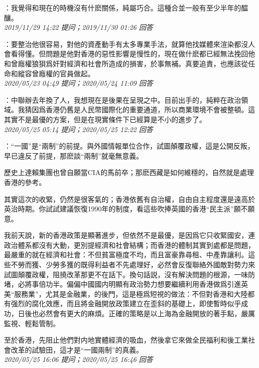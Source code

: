 \documentclass[twocolumn]{ctexart}
\begin{document}
：我覺得和現在的時機沒有什麽關係，純屬巧合。這種合並一般有至少半年的醖釀。
\\

\textit{\hfill\noindent\small 2019/11/29 14:22 提问；2019/11/30 01:26 回答}

：要整治他很容易，對他的資產動手有太多專業手法，就算他找媒體來渲染都沒人會看得懂。但問題是他對香港的惡性影響是慢性的，現在做什麽都已經無法挽回他和曾廕權狼狽爲奸對經濟和社會所造成的損害，於事無補。真要追責，也應該從任命和縱容曾廕權的官員做起。
\\

\textit{\hfill\noindent\small 2020/05/23 04:49 提问；2020/05/24 11:09 回答}

：中聯辦去年換了人，我想現在是後果在呈現之中。目前出手的，純粹在政治領域。我猜因爲香港仍舊是人民幣國際化的重要通道，所以商業環境不會被整頓。這其實不是最優的方案，但是在現實條件下已經算是不小的進步了。
\\

\textit{\hfill\noindent\small 2020/05/25 05:14 提问；2020/05/25 12:22 回答}

：“一國”是“兩制”的前提。與外國情報單位合作，試圖顛覆政權，這是公開反叛，早已違反了前提，那麽談“兩制”就毫無意義。

歷史上達賴集團也曾自願當CIA的馬前卒；那麽西藏是如何維穩的，自然就是處理香港的參考。

其實這次的收緊，仍然是很客氣的；香港依舊有自治權，自由自主程度還是遠高於英治時期。你試試建議恢復1990年的制度，看這些吹捧英國的香港“民主派”願不願意。

我前天說，新的香港政策是顯著進步，但依然不是最優，是因爲它只收緊國安，連政治體系都沒有大動，更別提經濟和社會結構；而香港的體制其實到處都是問題，最嚴重的就在經濟和社會：不但貧富極度不均，而且富豪靠尋租、中產靠讓利。這些不勞而獲、少勞多獲的既得利益者不先處理好，必然會反復聯絡外國敵對勢力來試圖顛覆政權，阻撓改革那更不在話下。換句話説，沒有解決問題的根源，一味防堵，必將事倍功半。偏偏中國國内明顯有政治勢力想要繼續利用香港做爲引進英美“服務業”，尤其是金融業，的後門，這是極爲短視的做法：不但對香港和大陸都有强烈的腐化效應，而且將金融開放政策建立在歪斜的基礎上，即使暫時似乎成功，日後也必然會有更大的麻煩。正確的策略是以上海為金融開放的著手點，嚴厲監視、輕鬆管制。

至於香港，先阻止他們對内地實體經濟的吸血，然後拿它來做全民福利和後工業社會改革的試驗田，這才是“一國兩制”的真義。
\\

\textit{\hfill\noindent\small 2020/05/25 16:06 提问；2020/05/25 16:46 回答}
\end{document}
